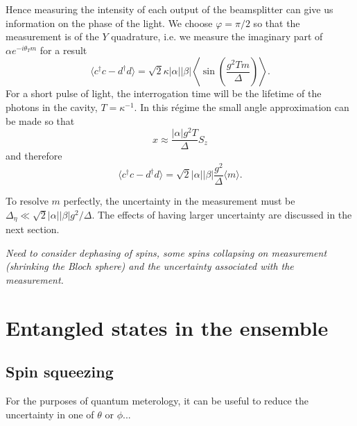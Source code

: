 \documentclass{article}
\begin{document}
Hence measuring the intensity of each output of the beamsplitter can give us
information on the phase of the light. We choose $\varphi = \pi/2$ so that the
measurement is of the $Y$ quadrature, i.e. we measure the imaginary part of
$\alpha e^{-i\theta_Tm}$ for a result
%
\begin{equation}
  \langle c^\dagger c - d^\dagger d\rangle = \sqrt{2}\kappa |\alpha||\beta|\left\langle\sin(\frac{g^2 T
  m}{\Delta})\right\rangle.
\end{equation}
%
For a short pulse of light, the interrogation time will be the lifetime of the
photons in the cavity, $T = \kappa^{-1}$. In this r\'egime the small angle
approximation can be made so that
%
\begin{equation}
  x \approx \frac{|\alpha|g^2 T}{\Delta}S_z
  \label{eqn:xapprox}
\end{equation}
%
and therefore
%
\begin{equation}
  \langle c^\dagger c - d^\dagger d\rangle = \sqrt{2}|\alpha||\beta|
  \frac{g^2}{\Delta}\langle m\rangle.
  \label{eqn:homomeas}
\end{equation}

To resolve $m$ perfectly, the uncertainty in the measurement must be
$\Delta_\eta \ll \sqrt{2}|\alpha||\beta|g^2/\Delta$. 
%
%
The effects of having larger uncertainty are discussed in the next section.

\emph{
Need to consider dephasing of spins, some spins collapsing on measurement
(shrinking the Bloch sphere) and the uncertainty associated with the
measurement.
}

\section{Entangled states in the ensemble}


\subsection{Spin squeezing}


For the purposes of quantum meterology, it can be useful to reduce the
uncertainty in one of $\theta$ or $\phi$...
\end{document}
